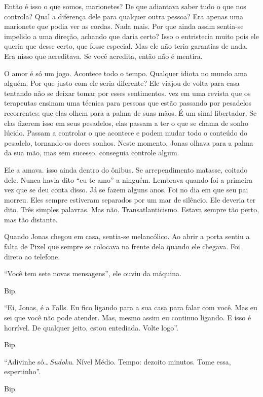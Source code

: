 Então é isso o que somos, marionetes? De que adiantava saber tudo o que nos controla? Qual a diferença dele para qualquer outra pessoa? Era apenas uma marionete que podia ver as cordas. Nada mais. Por que ainda assim sentia-se impelido a uma direção, achando que daria certo? Isso o entristecia muito\mudanca{,} pois ele queria que desse certo, que fosse especial. Mas ele não teria garantias de nada. Era nisso que acreditava. Se você acredita, então não é mentira.

O amor é só um jogo. Acontece todo o tempo. Qualquer idiota no mundo ama alguém. Por que justo com ele seria diferente? Ele viajou de volta para casa tentando não se deixar tomar por esses sentimentos.  vez  em uma revista que os terapeutas ensinam uma técnica para pessoas que estão passando por pesadelos recorrentes: que elas olhem para a palma de suas mãos. É um sinal libertador. Se elas fizerem isso em seus pesadelos, elas passam a ter o que se chama de sonho lúcido. Passam a controlar o que acontece e podem mudar todo o conteúdo do pesadelo, tornando-os doces sonhos. Neste momento, Jonas olhava para a palma da sua mão, mas sem sucesso.  conseguia controle algum.

Ele a amava.  isso ainda dentro do ônibus. Se arrependimento matasse, coitado dele. Nunca havia dito ``eu te amo'' a ninguém. Lembrava quando foi a primeira vez que se deu conta disso. Já se fazem alguns anos. Foi no dia em que seu pai morreu. Eles sempre estiveram separados por um mar de silêncio. Ele deveria ter dito. Três simples palavras. Mas não. Transatlanticismo. Estava sempre tão perto, mas tão distante.

Quando Jonas chegou em casa, sentia-se melancólico. Ao abrir a porta sentiu a falta de Pixel\mudanca{,} que sempre se colocava na frente dela quando ele chegava. Foi direto ao telefone.

``Você tem sete novas mensagens'', ele ouviu da máquina.

Bip.

``Ei, Jonas, é a Falls. Eu fico ligando para a sua casa para falar com você. Mas eu sei que você não pode atender. Mas, mesmo assim eu continuo ligando. E isso é horrível. De qualquer jeito, estou entediada. Volte logo''.

Bip.

``Adivinhe só\ldots\,\emph{Sudoku}. Nível Médio. Tempo: dezoito minutos. Tome essa, espertinho''.

Bip.

